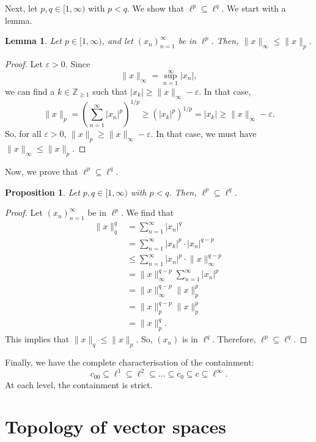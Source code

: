 \documentclass[a4paper, openany]{memoir}
\theoremstyle{definition}
\theoremstyle{plain}
\newtheorem{lemma}[definition]{Lemma}
\newtheorem{proposition}[definition]{Proposition}
\begin{document}
Next, let $p, q \in [1, \infty)$ with $p < q$. We show that $\ell^p \subseteq \ell^q$. We start with a lemma.
\begin{lemma}
    Let $p \in [1, \infty)$, and let $(x_n)_{n=1}^\infty$ be in $\ell^p$. Then, $\lVert x \rVert_\infty \leq \lVert x \rVert_p$.
\end{lemma}
\begin{proof}
    Let $\varepsilon > 0$. Since
    \[\lVert x \rVert_\infty = \sup_{n=1}^\infty |x_n|,\]
    we can find a $k \in \mathbb{Z}_{\geq 1}$ such that $|x_k| \geq \lVert x \rVert_\infty - \varepsilon$. In that case,
    \[\lVert x \rVert_p = \left(\sum_{n=1}^\infty |x_n|^p\right)^{1/p} \geq (|x_k|^p)^{1/p} = |x_k| \geq \lVert x \rVert_\infty - \varepsilon.\]
    So, for all $\varepsilon > 0$, $\lVert x \rVert_p \geq \lVert x \rVert_\infty - \varepsilon$. In that case, we must have $\lVert x \rVert_\infty \leq \lVert x \rVert_p$.
\end{proof}
Now, we prove that $\ell^p \subseteq \ell^q$.
\begin{proposition}
    Let $p, q \in [1, \infty)$ with $p < q$. Then, $\ell^p \subseteq \ell^q$.
\end{proposition}
\begin{proof}
    Let $(x_n)_{n=1}^\infty$ be in $\ell^p$. We find that
    \begin{align*}
        \lVert x \rVert_q^q &= \sum_{n=1}^\infty |x_n|^q \\
        &= \sum_{n=1}^\infty |x_k|^p \cdot |x_n|^{q-p} \\
        &\leq \sum_{n=1}^\infty |x_n|^p \cdot \lVert x \rVert_\infty^{q-p} \\
        &= \lVert x \rVert_\infty^{q-p} \sum_{n=1}^\infty |x_n|^p \\
        &= \lVert x \rVert_\infty^{q-p} \lVert x \rVert_p^p \\ 
        &= \lVert x \rVert_p^{q-p} \lVert x \rVert_p^p \\
        &= \lVert x \rVert_p^q.
    \end{align*}
    This implies that $\lVert x \rVert_q \leq \lVert x \rVert_p$. So, $(x_n)$ is in $\ell^q$. Therefore, $\ell^p \subseteq \ell^q$.
\end{proof}
Finally, we have the complete characterisation of the containment:
\[c_{00} \subseteq \ell^1 \subseteq \ell^2 \subseteq \dots \subseteq c_0 \subseteq c \subseteq \ell^\infty.\]
At each level, the containment is strict.
\newpage

\section{Topology of vector spaces}
\end{document}
